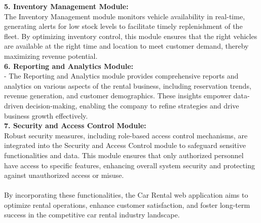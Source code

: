 \textbf{5. Inventory Management Module:\\}
The Inventory Management module monitors vehicle availability in real-time, generating alerts for low stock levels to facilitate timely replenishment of the fleet. By optimizing inventory control, this module ensures that the right vehicles are available at the right time and location to meet customer demand, thereby maximizing revenue potential.\\

\textbf{6. Reporting and Analytics Module:\\}
   - The Reporting and Analytics module provides comprehensive reports and analytics on various aspects of the rental business, including reservation trends, revenue generation, and customer demographics. These insights empower data-driven decision-making, enabling the company to refine strategies and drive business growth effectively.\\

\textbf{7. Security and Access Control Module:\\}
Robust security measures, including role-based access control mechanisms, are integrated into the Security and Access Control module to safeguard sensitive functionalities and data. This module ensures that only authorized personnel have access to specific features, enhancing overall system security and protecting against unauthorized access or misuse.\\\\

By incorporating these functionalities, the Car Rental web application aims to optimize rental operations, enhance customer satisfaction, and foster long-term success in the competitive car rental industry landscape.\newpage